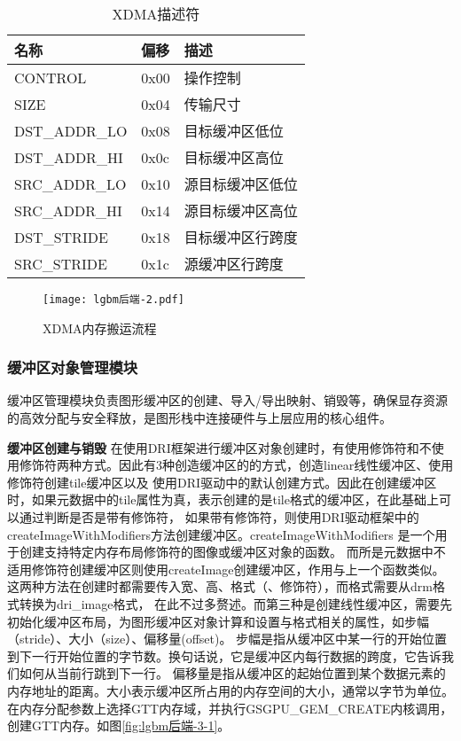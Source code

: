 \begin{table}[h]  
  \centering
  \caption{XDMA描述符}
  \label{tab:XDMA描述符}
  \begin{tabular}{lll}
    \toprule
    名称  & 偏移 & 描述\\
    \midrule
    CONTROL & 0x00 & 操作控制\\
    SIZE & 0x04 & 传输尺寸\\
    DST\_ADDR\_LO & 0x08 & 目标缓冲区低位\\
    DST\_ADDR\_HI & 0x0c & 目标缓冲区高位\\
    SRC\_ADDR\_LO & 0x10 & 源目标缓冲区低位\\
    SRC\_ADDR\_HI & 0x14 & 源目标缓冲区高位\\
    DST\_STRIDE & 0x18 & 目标缓冲区行跨度\\
    SRC\_STRIDE & 0x1c & 源缓冲区行跨度\\
    \bottomrule
  \end{tabular}
  \note{}
\end{table}

\begin{figure}[h]
  \centering
  \texttt{[image: lgbm后端-2.pdf]}
  \caption{XDMA内存搬运流程}
  \label{fig:lgbm后端-2}
\end{figure}  

\subsubsection{缓冲区对象管理模块}

缓冲区管理模块负责图形缓冲区的创建、导入/导出映射、销毁等，确保显存资源的高效分配与安全释放，是图形栈中连接硬件与上层应用的核心组件。

\textbf{缓冲区创建与销毁}
在使用DRI框架进行缓冲区对象创建时，有使用修饰符和不使用修饰符两种方式。因此有3种创造缓冲区的的方式，创造linear线性缓冲区、使用修饰符创建tile缓冲区以及
使用DRI驱动中的默认创建方式。因此在创建缓冲区时，如果元数据中的tile属性为真，表示创建的是tile格式的缓冲区，在此基础上可以通过判断是否是带有修饰符，
如果带有修饰符，则使用DRI驱动框架中的createImageWithModifiers方法创建缓冲区。createImageWithModifiers 是一个用于创建支持特定内存布局修饰符的图像或缓冲区对象的函数。
而所是元数据中不适用修饰符创建缓冲区则使用createImage创建缓冲区，作用与上一个函数类似。这两种方法在创建时都需要传入宽、高、格式（、修饰符），而格式需要从drm格式转换为dri\_image格式，
在此不过多赘述。而第三种是创建线性缓冲区，需要先初始化缓冲区布局，为图形缓冲区对象计算和设置与格式相关的属性，如步幅（stride）、大小（size）、偏移量(offset)。
步幅是指从缓冲区中某一行的开始位置到下一行开始位置的字节数。换句话说，它是缓冲区内每行数据的跨度，它告诉我们如何从当前行跳到下一行。
偏移量是指从缓冲区的起始位置到某个数据元素的内存地址的距离。大小表示缓冲区所占用的内存空间的大小，通常以字节为单位。
在内存分配参数上选择GTT内存域，并执行GSGPU\_GEM\_CREATE内核调用，创建GTT内存。如图\ref{fig:lgbm后端-3-1}。

